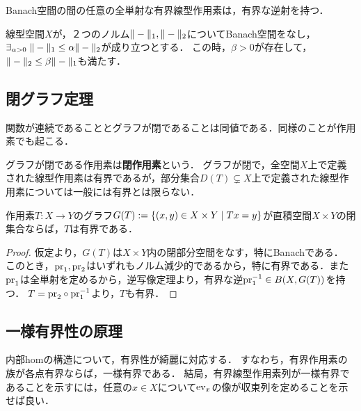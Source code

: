 \documentclass[uplatex,dvipdfmx]{jsreport}
\begin{document}
\begin{corollary}[逆写像定理]\label{cor-inverse-mapping-theorem}
    Banach空間の間の任意の全単射な有界線型作用素は，有界な逆射を持つ．
\end{corollary}

\begin{corollary}[ノルムが同値であることの十分条件]
    線型空間$X$が，２つのノルム$\|-\|_1,\|-\|_2$についてBanach空間をなし，$\exists_{\alpha>0}\;\|-\|_1\le\alpha\|-\|_2$が成り立つとする．
    この時，$\beta>0$が存在して，$\|-\|_2\le\beta\|-\|_1$も満たす．
\end{corollary}

\subsection{閉グラフ定理}

\begin{tcolorbox}[colframe=ForestGreen, colback=ForestGreen!10!white,breakable,colbacktitle=ForestGreen!40!white,coltitle=black,fonttitle=\bfseries\sffamily,
title=全空間で定義された閉作用素は有界である]
    関数が連続であることとグラフが閉であることは同値である．同様のことが作用素でも起こる．
    
    グラフが閉である作用素は\textbf{閉作用素}という．
    グラフが閉で，全空間$X$上で定義された線型作用素は有界であるが，部分集合$D(T)\subsetneq X$上で定義された線型作用素については一般には有界とは限らない．
\end{tcolorbox}

\begin{theorem}\label{thm-closed-graph-theorem}
    作用素$T:X\to Y$のグラフ$G(T):=\left\{(x,y)\in X\times Y\mid Tx=y\right\}$が直積空間$X\times Y$の閉集合ならば，$T$は有界である．
\end{theorem}
\begin{proof}
    仮定より，$G(T)$は$X\times Y$内の閉部分空間をなす，特にBanachである．
    このとき，$\mathrm{pr}_1,\mathrm{pr}_2$はいずれもノルム減少的であるから，特に有界である．また$\mathrm{pr}_1$は全単射を定めるから，逆写像定理より，有界な逆$\mathrm{pr}_1^{-1}\in B(X,G(T))$を持つ．
    $T=\mathrm{pr}_2\circ\mathrm{pr}_1^{-1}$より，$T$も有界．
\end{proof}

\subsection{一様有界性の原理}

\begin{tcolorbox}[colframe=ForestGreen, colback=ForestGreen!10!white,breakable,colbacktitle=ForestGreen!40!white,coltitle=black,fonttitle=\bfseries\sffamily,
title=]
    内部homの構造について，有界性が綺麗に対応する．
    すなわち，有界作用素の族が各点有界ならば，一様有界である．
    結局，有界線型作用素列が一様有界であることを示すには，任意の$x\in X$について$\mathrm{ev}_x$の像が収束列を定めることを示せば良い．
\end{tcolorbox}
\end{document}
